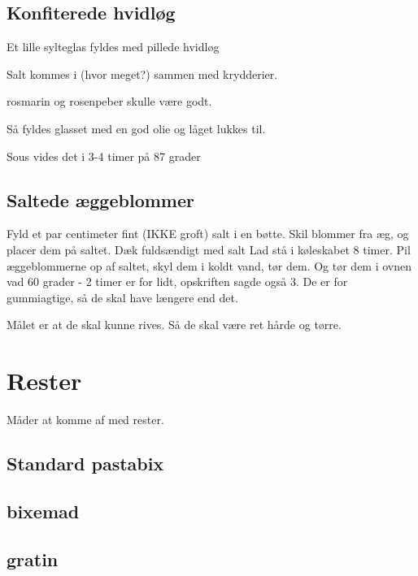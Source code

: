 \documentclass[
]{book}
\begin{document}
\hypertarget{konfiterede-hvidluxf8g}{%
\section{Konfiterede hvidløg}\label{konfiterede-hvidluxf8g}}

Et lille sylteglas fyldes med pillede hvidløg

Salt kommes i (hvor meget?) sammen med krydderier.

rosmarin og rosenpeber skulle være godt.

Så fyldes glasset med en god olie og låget lukkes til.

Sous vides det i 3-4 timer på 87 grader

\hypertarget{saltede-uxe6ggeblommer}{%
\section{Saltede æggeblommer}\label{saltede-uxe6ggeblommer}}

Fyld et par centimeter fint (IKKE groft) salt i en bøtte.
Skil blommer fra æg, og placer dem på saltet. Dæk fuldsændigt med salt
Lad stå i køleskabet 8 timer.
Pil æggeblommerne op af saltet, skyl dem i koldt vand, tør dem. Og
tør dem i ovnen vad 60 grader - 2 timer er for lidt, opskriften sagde også 3.
De er for gummiagtige, så de skal have længere end det.

Målet er at de skal kunne rives. Så de skal være ret hårde og tørre.

\hypertarget{rester}{%
\chapter{Rester}\label{rester}}

Måder at komme af med rester.

\hypertarget{standard-pastabix-1}{%
\section{Standard pastabix}\label{standard-pastabix-1}}

\hypertarget{bixemad}{%
\section{bixemad}\label{bixemad}}

\hypertarget{gratin}{%
\section{gratin}\label{gratin}}
\end{document}
